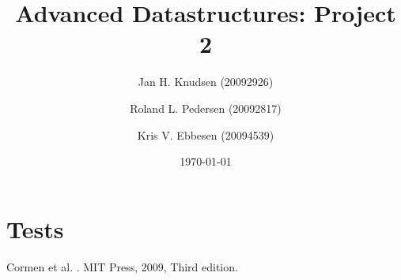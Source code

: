 \documentclass[a4paper, 12pt]{article}
\title{Advanced Datastructures: Project 2}
\date{\today}
\author{Jan H. Knudsen (20092926)
\and
Roland L. Pedersen (20092817)
\and
Kris V. Ebbesen (20094539)
}
\begin{document}
\maketitle
\newpage
\tableofcontents
\newpage



\section{Tests}


\begin{thebibliography}{9}

Cormen et al.
.
\newblock MIT Press, 2009, Third edition.

\end{thebibliography}
\end{document}

